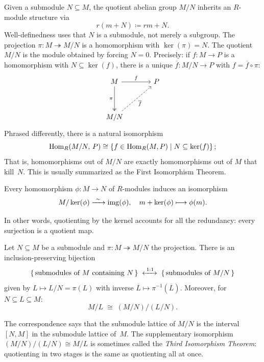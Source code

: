 \documentclass[Notebook.tex]{subfiles}
\begin{document}
    Given a submodule $N \subseteq M$, the quotient abelian group $M/N$ inherits an $R$-module structure via
    \[
    r(m+N) \coloneqq rm + N.
    \]
    Well-definedness uses that $N$ is a submodule, not merely a subgroup. The projection $\pi \colon M \twoheadrightarrow M/N$ is a homomorphism with $\ker(\pi) = N$. The quotient $M/N$ is the module obtained by forcing $N = 0$.  Precisely: if $f \colon M \to P$ is a homomorphism with $N \subseteq \ker(f)$, there is a unique $\overline{f} \colon M/N \to P$ with $f = \overline{f} \circ \pi$:
    \[
    \begin{tikzcd}[row sep = 3.5em, column sep = 3.5em]
    M \arrow[r,"f"] \arrow[d,two heads,"\pi"'] & P \\
    M/N \arrow[ur,dashed,"\overline{f}"'] &
    \end{tikzcd}
    \]
    Phrased differently, there is a natural isomorphism 
    \[
    \operatorname{Hom}_R(M/N,\, P) \cong \left\{ f \in \operatorname{Hom}_R(M,P) \mid N \subseteq \ker(f) \right\};
    \] 
    That is, homomorphisms out of $M/N$ are exactly homomorphisms out of $M$ that kill~$N$. This is usually summarized as the First Isomorphism Theorem. 
    
    \begin{theorem}
    Every homomorphism $\phi \colon M \to N$ of $R$-modules induces an isomorphism
    \[
        M/\ker(\phi) \xrightarrow{\ \sim\ } \operatorname{img}(\phi), \quad m + \ker(\phi) \longmapsto \phi(m).
    \]
    \end{theorem}
    
    In other words, quotienting by the kernel accounts for all the redundancy: every surjection is a quotient map.
    
    \begin{theorem}
    Let $N \subseteq M$ be a submodule and $\pi \colon M \twoheadrightarrow M/N$ the projection.  There is an inclusion-preserving bijection
    \[
        \left\{\, \text{submodules of } M \text{ containing } N \,\right\}
        \;\xleftrightarrow{\;1:1\;}\;
        \left\{\, \text{submodules of } M/N \,\right\}
    \]
    given by $L \mapsto L/N = \pi(L)$ with inverse $\overline{L} \mapsto \pi^{-1}(\overline{L})$.  Moreover, for $N \subseteq L \subseteq M$:
    \[
        M/L \;\cong\; (M/N)\big/(L/N).
    \]
    \end{theorem}
    
    The correspondence says that the submodule lattice of $M/N$ is the interval $[N, M]$ in the submodule lattice of~$M$.  The supplementary isomorphism $(M/N)/(L/N) \cong M/L$ is sometimes called the \emph{Third Isomorphism Theorem}: quotienting in two stages is the same as quotienting all at once.
    
\end{document}

